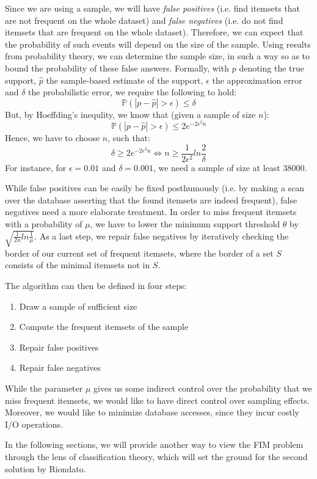 \documentclass[11pt]{sigplanconf}
\renewcommand\it{\textit}
\renewcommand\P{\mathds{P}}
\begin{document}
Since we are using a sample, we will have \it{false positives} (i.e. find itemsets that are not frequent on the whole dataset) and \it{false negatives} (i.e. do not find itemsets that are frequent on the whole dataset). Therefore, we can expect that the probability of such events will depend on the size of the sample. Using results from probability theory, we can determine the sample size, in such a way so as to bound the probability of these false answers. Formally, with $p$ denoting the true support, $\hat{p}$ the sample-based estimate of the support, $\epsilon$ the approximation error and $\delta$ the probabilistic error, we require the following to hold:
\[ \P(|p - \hat{p}| > \epsilon) \leq \delta
\]
But, by Hoeffding's inequlity, we know that (given a sample of size $n$):
\[ \P(|p - \hat{p}| > \epsilon) \leq 2e^{-2\epsilon^2n}
\]
Hence, we have to choose $n$, such that:
\[ \delta \geq 2e^{-2\epsilon^2n} \iff n \geq \frac{1}{2\epsilon^2}ln\frac{2}{\delta}
\]
For instance, for $\epsilon = 0.01$ and $\delta = 0.001$, we need a sample of size at least 38000.

While false positives can be easily be fixed posthumously (i.e. by making a scan over the database asserting that the found itemsets are indeed frequent), false negatives need a more elaborate treatment. In order to miss frequent itemsets with a probability of $\mu$, we have to lower the minimum support threshold $\theta$ by $\sqrt{\frac{1}{2n}ln\frac{1}{\mu}}$. As a last step, we repair false negatives by iteratively checking the border  of our current set of frequent itemsets, where the border of a set $S$ consists of the minimal itemsets not in $S$.

The algorithm can then be defined in four steps:
\begin{enumerate}
\item Draw a sample of sufficient size 
\item Compute the frequent itemsets of the sample
\item Repair false positives
\item Repair false negatives
\end{enumerate}

While the parameter $\mu$ gives us some indirect control over the probability that we miss frequent itemsets, we would like to have direct control over sampling effects. Moreover, we would like to minimize database accesses, since they incur costly I/O operations.

In the following sections, we will provide another way to view the FIM problem through the lens of classification theory, which will set the ground for the second solution by Riondato.
\end{document}
